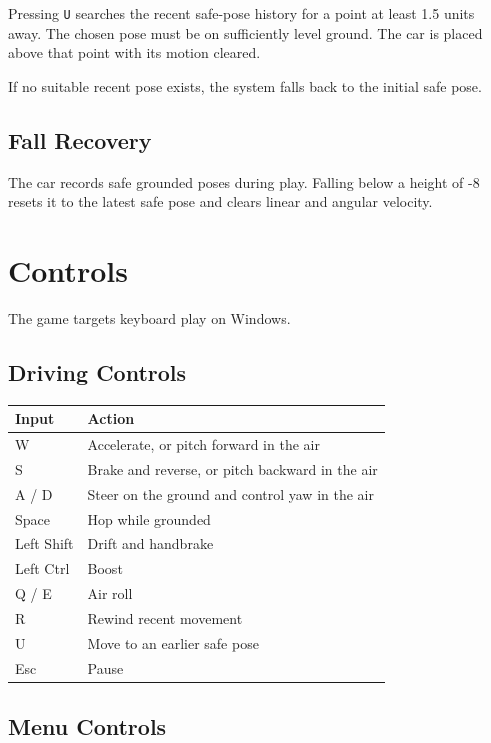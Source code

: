 \documentclass[11pt,a4paper]{article}
\begin{document}
Pressing \texttt{U} searches the recent safe-pose history for a point at least 1.5 units away. The chosen pose must be on sufficiently level ground. The car is placed above that point with its motion cleared.

If no suitable recent pose exists, the system falls back to the initial safe pose.

\subsection{Fall Recovery}\label{fall-recovery}

The car records safe grounded poses during play. Falling below a height of -8 resets it to the latest safe pose and clears linear and angular velocity.

\section{Controls}\label{controls}

The game targets keyboard play on Windows.

\subsection{Driving Controls}\label{driving-controls}

\begin{longtable}[]{@{}ll@{}}
\toprule\noalign{}
\textbf{Input} & \textbf{Action} \\
\midrule\noalign{}
\endhead
\bottomrule\noalign{}
\endlastfoot
W & Accelerate, or pitch forward in the air \\
S & Brake and reverse, or pitch backward in the air \\
A / D & Steer on the ground and control yaw in the air \\
Space & Hop while grounded \\
Left Shift & Drift and handbrake \\
Left Ctrl & Boost \\
Q / E & Air roll \\
R & Rewind recent movement \\
U & Move to an earlier safe pose \\
Esc & Pause \\
\end{longtable}

\subsection{Menu Controls}\label{menu-controls}
\end{document}
